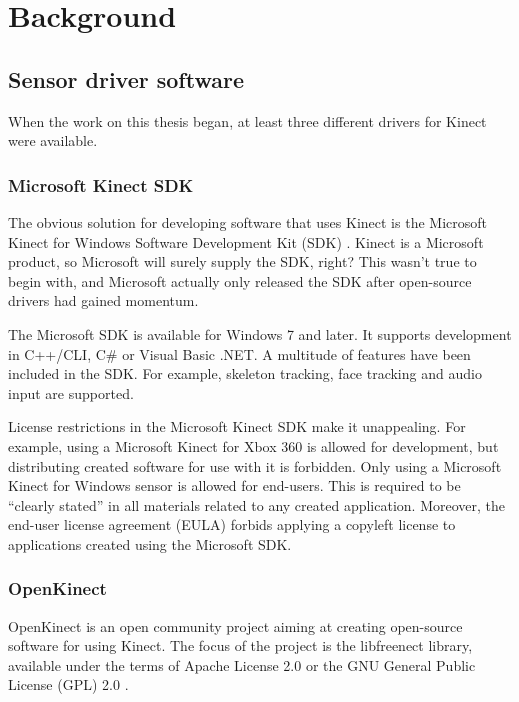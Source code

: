 \chapter{Background}


\section{Sensor driver software} \label{literature.drivers}

When the work on this thesis began, at least three different drivers for Kinect were available. 

\subsection{Microsoft Kinect SDK}

The obvious solution for developing software that uses Kinect is the Microsoft Kinect for Windows Software Development Kit (SDK) \citep{KinectSDK}. Kinect is a Microsoft product, so Microsoft will surely supply the SDK, right? This wasn't true to begin with, and Microsoft actually only released the SDK after open-source drivers had gained momentum.

The Microsoft SDK is available for Windows 7 and later. It supports development in C++/CLI, C\# or Visual Basic .NET. A multitude of features have been included in the SDK. For example, skeleton tracking, face tracking and audio input are supported.

License restrictions in the Microsoft Kinect SDK make it unappealing. For example, using a Microsoft Kinect for Xbox 360 is allowed for development, but distributing created software for use with it is forbidden. Only using a Microsoft Kinect for Windows sensor is allowed for end-users. This is required to be ``clearly stated'' in all materials related to any created application. Moreover, the end-user license agreement (EULA) forbids applying a copyleft license to applications created using the Microsoft SDK. \citep{kinectEULA}

\subsection{OpenKinect}

OpenKinect \citep{openkinect} is an open community project aiming at creating open-source software for using Kinect. The focus of the project is the libfreenect library, available under the terms of Apache License 2.0 \citep{Apache2} or the GNU General Public License (GPL) 2.0 \citep{GPL2}.

